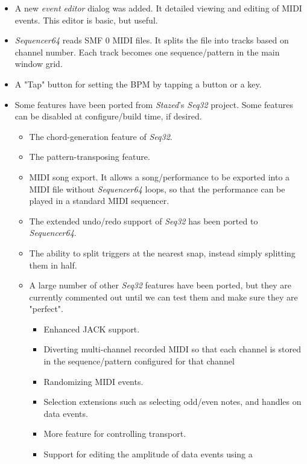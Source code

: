 \documentclass[
 11pt,
 twoside,
 a4paper,
 headinclude,
 footinclude,
 final                                 %
]{article}
\begin{document}
   \begin{itemize}
      \item A new \textsl{event editor} dialog was added.
         It detailed viewing and editing of MIDI events.
         This editor is basic, but useful.
      \item \textsl{Sequencer64} reads SMF 0 MIDI files.  It splits
         the file into tracks based on channel number.  Each track becomes one
         sequence/pattern in the main window grid.
      \item A "Tap" button for setting the BPM by tapping a button or a key.
      \item Some features have been ported from \textsl{Stazed}'s
      \textsl{Seq32} \cite{seq32} project.  Some features can be disabled at
      configure/build time, if desired.
      \begin{itemize}
         \item The chord-generation feature of \textsl{Seq32}.
         \item The pattern-transposing feature.
         \item MIDI song export.
            It allows a song/performance to be exported into a MIDI file
            without \textsl{Sequencer64} loops, so that the performance can be
            played in a standard MIDI sequencer.
         \item The extended undo/redo support of \textsl{Seq32} has been
            ported to \textsl{Sequencer64}.
         \item The ability to split triggers at the nearest snap, instead
            simply splitting them in half.
         \item A large number of other \textsl{Seq32} features have been
            ported, but they are currently commented out until we can test them
            and make sure they are "perfect".
         \begin{itemize}
            \item Enhanced JACK support.
            \item Diverting multi-channel recorded MIDI so that each channel
               is stored in the sequence/pattern configured for that channel
            \item Randomizing MIDI events.
            \item Selection extensions such as selecting odd/even notes, and
            handles on data events.
            \item More feature for controlling transport.
            \item Support for editing the amplitude of data events using a

\end{itemize}
\end{itemize}
\end{itemize}
\end{document}
